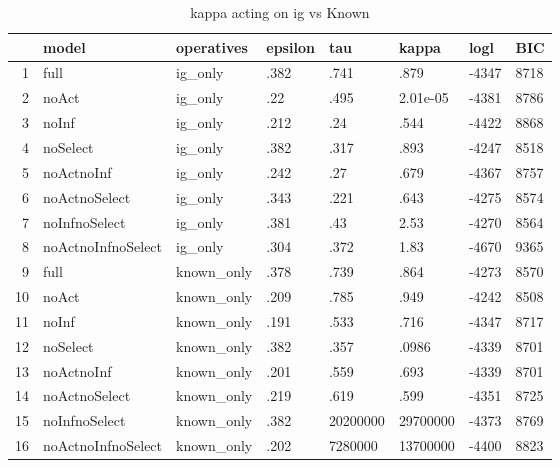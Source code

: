 \begin{table}[ht]
\centering
\begin{tabular}{rlllllll}
  \hline
 & model & operatives & epsilon & tau & kappa & logl & BIC \\ 
  \hline
1 & full & ig\_only & .382 & .741 & .879 & -4347 & 8718 \\ 
  2 & noAct & ig\_only & .22 & .495 & 2.01e-05 & -4381 & 8786 \\ 
  3 & noInf & ig\_only & .212 & .24 & .544 & -4422 & 8868 \\ 
  4 & noSelect & ig\_only & .382 & .317 & .893 & -4247 & 8518 \\ 
  5 & noActnoInf & ig\_only & .242 & .27 & .679 & -4367 & 8757 \\ 
  6 & noActnoSelect & ig\_only & .343 & .221 & .643 & -4275 & 8574 \\ 
  7 & noInfnoSelect & ig\_only & .381 & .43 & 2.53 & -4270 & 8564 \\ 
  8 & noActnoInfnoSelect & ig\_only & .304 & .372 & 1.83 & -4670 & 9365 \\ 
  9 & full & known\_only & .378 & .739 & .864 & -4273 & 8570 \\ 
  10 & noAct & known\_only & .209 & .785 & .949 & -4242 & 8508 \\ 
  11 & noInf & known\_only & .191 & .533 & .716 & -4347 & 8717 \\ 
  12 & noSelect & known\_only & .382 & .357 & .0986 & -4339 & 8701 \\ 
  13 & noActnoInf & known\_only & .201 & .559 & .693 & -4339 & 8701 \\ 
  14 & noActnoSelect & known\_only & .219 & .619 & .599 & -4351 & 8725 \\ 
  15 & noInfnoSelect & known\_only & .382 & 20200000 & 29700000 & -4373 & 8769 \\ 
  16 & noActnoInfnoSelect & known\_only & .202 & 7280000 & 13700000 & -4400 & 8823 \\ 
   \hline
\end{tabular}
\caption{kappa acting on ig vs Known} 
\end{table}
